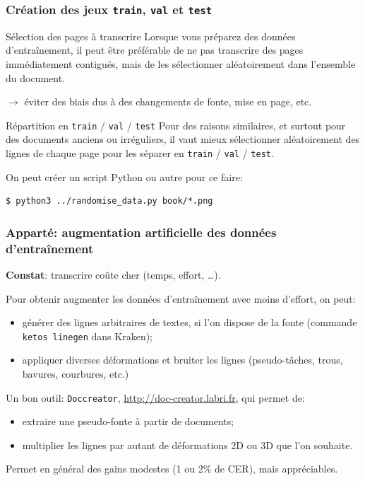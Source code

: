 \documentclass[10pt, compress,urlcolor=blue]{beamer}
\begin{document}
\begin{frame}[fragile]
\frametitle{Création des jeux \texttt{train}, \texttt{val} et \texttt{test}}
	
\begin{block}{Sélection des pages à transcrire}
	Lorsque vous préparez des données d'entraînement, il peut être préférable de ne pas transcrire des pages immédiatement contiguës, mais de les sélectionner aléatoirement dans l'ensemble du document.

	$\rightarrow$ éviter des biais dus à des changements de fonte, mise en page, etc.
\end{block}	

\begin{block}{Répartition en \texttt{train} / \texttt{val} / \texttt{test}}
	Pour des raisons similaires, et \alert{surtout pour des documents anciens} ou irréguliers, il vaut mieux
	sélectionner aléatoirement des lignes de chaque page pour les séparer en \texttt{train} / \texttt{val} / \texttt{test}.
	
\end{block}	

On peut créer un script Python ou autre pour ce faire:
\begin{verbatim}
$ python3 ../randomise_data.py book/*.png
\end{verbatim}
	
\end{frame}


\begin{frame}[fragile]
\frametitle{Apparté: augmentation artificielle des données d'entraînement}

\textbf{Constat}: \alert{transcrire coûte cher} (temps, effort, …). 

Pour obtenir augmenter les données d'entraînement avec moins d'effort, on peut:

\begin{itemize}
	\item générer des lignes arbitraires de textes, si l'on dispose de la fonte (commande \texttt{ketos linegen} dans Kraken);
	\item appliquer diverses déformations et bruiter les lignes (pseudo-tâches, trous, bavures, courbures, etc.)
\end{itemize}

Un bon outil: \texttt{Doccreator}, \href{http://doc-creator.labri.fr}{http://doc-creator.labri.fr}, qui permet de:
\begin{itemize}
	\item extraire une pseudo-fonte à partir de documents;
	\item multiplier les lignes par autant de déformations 2D ou 3D que l'on souhaite.
\end{itemize}

Permet en général des gains modestes (1 ou 2\% de CER), mais appréciables.

\end{frame}
\end{document}
